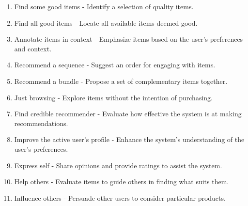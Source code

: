 \documentclass[\myFontSize,a4paper,oneside,hidelinks]{article}
\begin{document}
\begin{enumerate}[label=\textbf{\arabic*.}]
    \item Find some good items - Identify a selection of quality items.
    \item Find all good items - Locate all available items deemed good.
    \item Annotate items in context - Emphasize items based on the user's preferences and context.
    \item Recommend a sequence - Suggest an order for engaging with items.
    \item Recommend a bundle - Propose a set of complementary items together.
    \item Just browsing - Explore items without the intention of purchasing.
    \item Find credible recommender - Evaluate how effective the system is at making recommendations.
    \item Improve the active user's profile - Enhance the system's understanding of the user's preferences.
    \item Express self - Share opinions and provide ratings to assist the system.
    \item Help others - Evaluate items to guide others in finding what suits them.
    \item Influence others - Persuade other users to consider particular products.
\end{enumerate}
\end{document}
